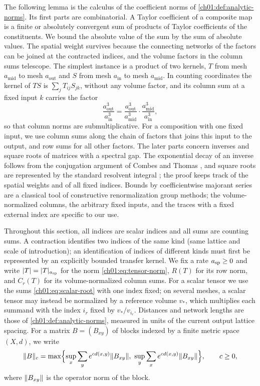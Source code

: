 The following lemma is the calculus of the coefficient norms of \cref{ch01:def:analytic-norms}. Its first parts are combinatorial. A Taylor coefficient of a composite map is a finite or absolutely convergent sum of products of Taylor coefficients of the constituents. We bound the absolute value of the sum by the sum of absolute values. The spatial weight survives because the connecting networks of the factors can be joined at the contracted indices, and the volume factors in the column sums telescope. The simplest instance is a product of two kernels, $T$ from mesh $a_{\mathrm{mid}}$ to mesh $a_{\mathrm{out}}$ and $S$ from mesh $a_{\mathrm{in}}$ to mesh $a_{\mathrm{mid}}$. In counting coordinates the kernel of $TS$ is $\sum_jT_{ij}S_{jk}$, without any volume factor, and its column sum at a fixed input $k$ carries the factor
\[
 \frac{a_{\mathrm{out}}^3}{a_{\mathrm{in}}^3}=\frac{a_{\mathrm{out}}^3}{a_{\mathrm{mid}}^3}\cdot\frac{a_{\mathrm{mid}}^3}{a_{\mathrm{in}}^3},
\]
so that column norms are submultiplicative. For a composition with one fixed input, we use column sums along the chain of factors that joins this input to the output, and row sums for all other factors. The later parts concern inverses and square roots of matrices with a spectral gap. The exponential decay of an inverse follows from the conjugation argument of Combes and Thomas \cite{CombesThomas1973}, and square roots are represented by the standard resolvent integral \cite{Bhatia1997}; the proof keeps track of the spatial weights and of all fixed indices. Bounds by coefficientwise majorant series are a classical tool of constructive renormalization group methods; the volume-normalized columns, the arbitrary fixed inputs, and the traces with a fixed external index are specific to our use.

Throughout this section, all indices are scalar indices and all sums are counting sums. A contraction identifies two indices of the same kind (same lattice and scale of introduction); an identification of indices of different kinds must first be represented by an explicitly bounded transfer kernel. We fix a rate $a_{\mathrm{sp}}\ge0$ and write $\lvert T\rvert=\lvert T\rvert_{a_{\mathrm{sp}}}$ for the norm \eqref{ch01:eq:tensor-norm}, $R(T)$ for its row norm, and $C_r(T)$ for its volume-normalized column sums. For a scalar tensor we use the sums \eqref{ch01:eq:scalar-root} with one index fixed; on several meshes, a scalar tensor may instead be normalized by a reference volume $v_*$, which multiplies each summand with the index $i_r$ fixed by $v_*/v_{i_r}$. Distances and network lengths are those of \cref{ch01:def:analytic-norms}, measured in units of the current output lattice spacing. For a matrix $B=(B_{xy})$ of blocks indexed by a finite metric space $(X,d)$, we write
\[
 \norm B_c=\max\Bigl\{\sup_x\sum_ye^{cd(x,y)}\norm{B_{xy}},\ \sup_y\sum_xe^{cd(x,y)}\norm{B_{xy}}\Bigr\},\qquad c\ge0,
\]
where $\lVert B_{xy}\rVert$ is the operator norm of the block.


